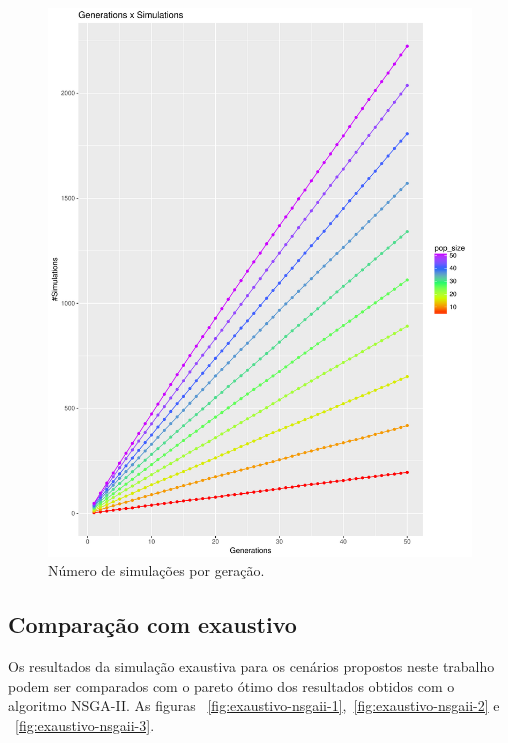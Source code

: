 \documentclass[conference]{IEEEtran}
\begin{document}
\begin{figure}[h]
  \centering
  \includegraphics[scale=0.30]{figures/SimulacoesPorGeracao.pdf}
  \caption{Número de simulações por geração.}
  \label{fig:result-sim}
\end{figure}

\subsection{Comparação com exaustivo}

Os resultados da simulação exaustiva para os cenários propostos neste
trabalho podem ser comparados com o pareto ótimo dos resultados
obtidos com o algoritmo NSGA-II. As figuras ~\ref{fig:exaustivo-nsgaii-1},~\ref{fig:exaustivo-nsgaii-2} e ~\ref{fig:exaustivo-nsgaii-3}.
\end{document}
